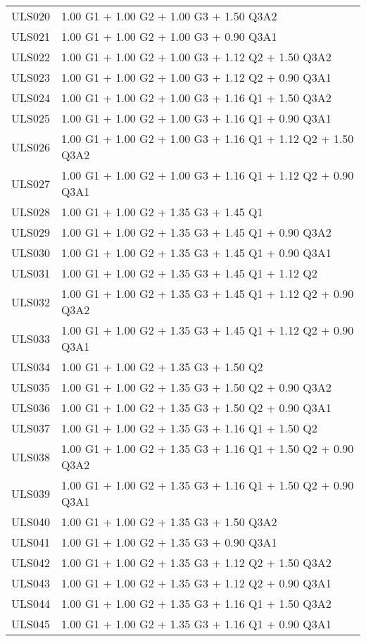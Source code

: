 \begin{center}
\begin{small}
\begin{longtable}{|l|p{10cm}|}
ULS020 & 1.00 G1 + 1.00 G2 + 1.00 G3 + 1.50 Q3A2\\
ULS021 & 1.00 G1 + 1.00 G2 + 1.00 G3 + 0.90 Q3A1\\
ULS022 & 1.00 G1 + 1.00 G2 + 1.00 G3 + 1.12 Q2 + 1.50 Q3A2\\
ULS023 & 1.00 G1 + 1.00 G2 + 1.00 G3 + 1.12 Q2 + 0.90 Q3A1\\
ULS024 & 1.00 G1 + 1.00 G2 + 1.00 G3 + 1.16 Q1 + 1.50 Q3A2\\
ULS025 & 1.00 G1 + 1.00 G2 + 1.00 G3 + 1.16 Q1 + 0.90 Q3A1\\
ULS026 & 1.00 G1 + 1.00 G2 + 1.00 G3 + 1.16 Q1 + 1.12 Q2 + 1.50 Q3A2\\
ULS027 & 1.00 G1 + 1.00 G2 + 1.00 G3 + 1.16 Q1 + 1.12 Q2 + 0.90 Q3A1\\
ULS028 & 1.00 G1 + 1.00 G2 + 1.35 G3 + 1.45 Q1\\
ULS029 & 1.00 G1 + 1.00 G2 + 1.35 G3 + 1.45 Q1 + 0.90 Q3A2\\
ULS030 & 1.00 G1 + 1.00 G2 + 1.35 G3 + 1.45 Q1 + 0.90 Q3A1\\
ULS031 & 1.00 G1 + 1.00 G2 + 1.35 G3 + 1.45 Q1 + 1.12 Q2\\
ULS032 & 1.00 G1 + 1.00 G2 + 1.35 G3 + 1.45 Q1 + 1.12 Q2 + 0.90 Q3A2\\
ULS033 & 1.00 G1 + 1.00 G2 + 1.35 G3 + 1.45 Q1 + 1.12 Q2 + 0.90 Q3A1\\
ULS034 & 1.00 G1 + 1.00 G2 + 1.35 G3 + 1.50 Q2\\
ULS035 & 1.00 G1 + 1.00 G2 + 1.35 G3 + 1.50 Q2 + 0.90 Q3A2\\
ULS036 & 1.00 G1 + 1.00 G2 + 1.35 G3 + 1.50 Q2 + 0.90 Q3A1\\
ULS037 & 1.00 G1 + 1.00 G2 + 1.35 G3 + 1.16 Q1 + 1.50 Q2\\
ULS038 & 1.00 G1 + 1.00 G2 + 1.35 G3 + 1.16 Q1 + 1.50 Q2 + 0.90 Q3A2\\
ULS039 & 1.00 G1 + 1.00 G2 + 1.35 G3 + 1.16 Q1 + 1.50 Q2 + 0.90 Q3A1\\
ULS040 & 1.00 G1 + 1.00 G2 + 1.35 G3 + 1.50 Q3A2\\
ULS041 & 1.00 G1 + 1.00 G2 + 1.35 G3 + 0.90 Q3A1\\
ULS042 & 1.00 G1 + 1.00 G2 + 1.35 G3 + 1.12 Q2 + 1.50 Q3A2\\
ULS043 & 1.00 G1 + 1.00 G2 + 1.35 G3 + 1.12 Q2 + 0.90 Q3A1\\
ULS044 & 1.00 G1 + 1.00 G2 + 1.35 G3 + 1.16 Q1 + 1.50 Q3A2\\
ULS045 & 1.00 G1 + 1.00 G2 + 1.35 G3 + 1.16 Q1 + 0.90 Q3A1\\

\end{longtable}
\end{small}
\end{center}
